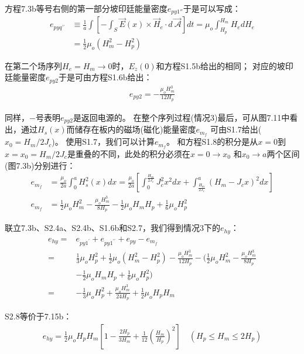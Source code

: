 方程7.3b等号右侧的第一部分坡印廷能量密度$e_{py1''}$于是可以写成：
\begin{align*}%
e_{pyq^{\prime\prime}}&\equiv\frac{1}{a}\int\left[-\int_{S}\vec{E}(x)\times\vec{H}_e\cdot d\vec{\ \mathcal{A}}\right]dt=\mu_o\int_{H_p}^{H_m}H_edH_e\\
&=\frac{1}{2}\mu_o(H_{m}^{2}-H_{p}^{2}) \tag{S2.4b}
\end{align*}

在第二个场序列$H_e=H_m\rightarrow 0$时，$E_z(0)$和方程S1.5b给出的相同；
对应的坡印廷能量密度$e_{py2}$于是可由方程S1.6b给出：
\begin{align*}%
e_{py2}=-\frac{\mu_oH_{m}^{3}}{12H_p} \tag{S1.6b}
\end{align*}

同样，$-$号表明$e_{py2}$是返回电源的。
在整个序列过程(情况3)最后，可从图7.11中看出，通过$H_s(x)$而储存在板内的磁场(磁化)能量密度$e_{m_f}$
可由S1.7给出($x_0=H_m/2 J_c$)。
使用S1.7，我们可以计算$e_{m_f}$。
和方程S1.8的积分是从$x=0$到$x=x_0=H_m/2J_c$是重叠的不同，此处的积分必须在$x=0\rightarrow x_0$
和$x_0\rightarrow a$两个区间(图7.3b)分别进行：
\begin{align*}%
e_{m_f}&=\frac{\mu_o}{2a}\int_{0}^{a}H_{s}^{2}(x)dx=\frac{\mu_o}{2a}\left[\int_{0}^{\frac{H_m}{2J_c}}J_{c}^{2}x^2dx+\int_{\frac{H_m}{2J_c}}^{a}(H_m-J_cx)^2dx\right]\\
e_{m_f}&=\frac{1}{2}\mu_oH_{m}^{2}-\frac{\mu_oH_{m}^{3}}{8H_p}-\frac{1}{2}\mu_oH_mH_p+\frac{1}{6}\mu_oH_{p}^{2}\tag{S2.7}
\end{align*}

联立7.3b、S2.4a、S2.4b、S1.6b和S2.7，我们得到情况3下的$e_{hy}$：
\begin{align*}%
e_{hy}=&e_{py1^\prime}+e_{py1^{\prime\prime}}+e_{py}-e_{m_f} \\
=&\frac{1}{3}\mu_oH_{p}^{2}+\frac{1}{2}\mu_o(H_{m}^{2}-H_{p}^{2})-\frac{\mu_oH_{m}^{3}}{12H_p} 
-\big(\frac{1}{2}\mu_oH_{m}^{2}-\frac{\mu_oH_{m}^{3}}{8H_p}\\
&-\frac{1}{2}\mu_oH_mH_p+\frac{1}{6}\mu_oH_{p}^{2}\big) \\
=&-\frac{1}{3}\mu_oH_{p}^{2}+\frac{\mu_oH_{m}^{3}}{24H_p}+\frac{1}{2}\mu_oH_pH_m \tag{S2.8}
\end{align*}

S2.8等价于7.15b：
\begin{align*}%
e_{hy}=\frac{1}{2}\mu_oH_pH_m\left[1-\frac{2H_p}{3H_m}+\frac{1}{12}\left(\frac{H_m}{H_p}\right)^2\right] \quad (H_p\leq H_m\leq 2H_p) \tag{7.15b}
\end{align*}

